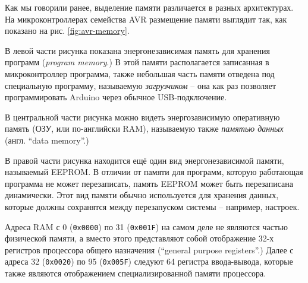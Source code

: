 \documentclass[../sparc.tex]{subfiles}
\begin{document}

Как мы говорили ранее, выделение памяти различается в разных архитектурах.  На
микроконтроллерах семейства AVR размещение памяти выглядит так, как показано на
рис. \ref{fig:avr-memory}.

В левой части рисунка показана энергонезависимая память для хранения программ
(\emph{program memory}.)  В этой памяти располагается записанная в
микроконтроллер программа, также небольшая часть памяти отведена под специальную
программу, называемую \emph{загрузчиком} -- она как раз позволяет программировать
Arduino через обычное USB-подключение.

В центральной части рисунка можно видеть энергозависимую оперативную память
(\gls{ОЗУ}, или по-английски \gls{RAM}), называемую также \emph{памятью данных}
(англ. ``data memory''.)

В правой части рисунка находится ещё один вид энергонезависимой памяти,
называемый \gls{EEPROM}.  В отличии от памяти для программ, которую работающая
программа не может перезаписать, память EEPROM может быть перезаписана
динамически.  Этот вид памяти обычно используется для хранения данных, которые
должны сохранятся между перезапуском системы -- например, настроек.

Адреса \gls{RAM} с 0 (\texttt{0x0000}) по 31 (\texttt{0x001F})
на самом деле не являются частью физической памяти, а вместо этого представляют
собой отображение 32-х регистров процессора общего назначения (``general purpose
registers''.)  Далее с адреса 32 (\texttt{0x0020}) по 95
(\texttt{0x005F}) следуют 64 регистра ввода-вывода, которые также
являются отображением специализированной памяти процессора.
\end{document}
